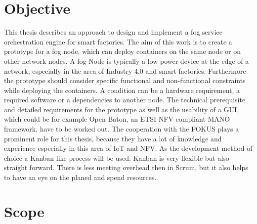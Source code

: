 \section{Objective}



This thesis describes an approach to design and implement a fog service orchestration engine for smart factories.
The aim of this work is to create a prototype for a fog node, which can deploy containers on the same node or on other network nodes.
A fog Node is typically a low power device at the edge of a network, especially in the area of Industry 4.0 and smart factories.
Furthermore the prototype should consider specific functional and non-functional constraints while deploying the containers.
A condition can be a hardware requirement, a required software or a dependencies to another node.
The technical prerequisite and detailed requirements for the prototype as well as the usability of a \ac{GUI}, which could be for example Open Baton, an \ac{ETSI} \ac{NFV} compliant \ac{MANO} framework, have to be worked out.
The cooperation with the \ac{FOKUS} plays a prominent role for this thesis, because they have a lot of knowledge and experience especially in this area of \ac{IoT} and \ac{NFV}.
As the development method of choice a Kanban like process will be used.
Kanban is very flexible but also straight forward.
There is less meeting overhead then in Scrum, but it also helps to have an eye on the planed and spend resources.


\section{Scope}

